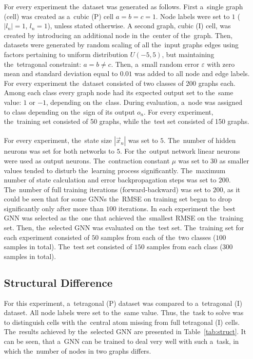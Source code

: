 \documentclass{llncs}
\begin{document}
\noindent For every experiment the~dataset was generated as follows. First a~single graph (cell) was created as a~cubic (P) cell $a = b = c = 1$. Node labels were set to $1$ ($|l_n| = 1$, $l_n = 1$), unless stated otherwise. A second graph, cubic (I) cell, was created by introducing an additional node in the~center of the~graph. Then, datasets were generated by random scaling of all the~input graphs edges using factors pertaining to uniform distribution $U(-5, 5)$, but maintaining the~tetragonal constraint: $a = b \neq c$. Then, a~small random error $\varepsilon$ with zero mean and standard deviation equal to $0.01$ was added to all node and edge labels. For every experiment the~dataset consisted of two classes of 200 graphs each. Among each class every graph node had its expected output set to the~same value: $1$ or $-1$, depending on the~class. During evaluation, a~node was assigned to class depending on the~sign of its output $o_n$. For every experiment, the~training set consisted of 50 graphs, while the~test set consisted of 150 graphs.
\\\\
For every experiment, the~state size $|\vec{x}_n|$ was set to $5$. The~number of hidden neurons was set for both networks to $5$. For the~output network linear neurons were used as output neurons. The~contraction constant $\mu$ was set to $30$ as smaller values tended to disturb the~learning process significantly. The~maximum number of state calculation and error backpropagation steps was set to $200$. The~number of full training iterations (forward-backward) was set to $200$, as it could be seen that for some GNNs the~RMSE on training set began to drop significantly only after more than $100$ iterations. In each experiment the~best GNN was selected as the~one that achieved the~smallest RMSE on the~training set. Then, the~selected GNN was evaluated on the~test set. The~training set for each experiment consisted of $50$ samples from each of the~two classes ($100$ samples in total). The~test set consisted of $150$ samples from each class ($300$ samples in total).

\subsection{Structural Difference}
For this experiment, a~tetragonal (P) dataset was compared to a~tetragonal (I) dataset. All node labels were set to the~same value. Thus, the~task to solve was to distinguish cells with the~central atom missing from full tetragonal (I) cells. The~results achieved by the~selected GNN are presented in Table~\ref{tab:struct}. It can be seen, that a~GNN can be trained to deal very well with such a~task, in which the~number of nodes in two graphs differs.
\end{document}
